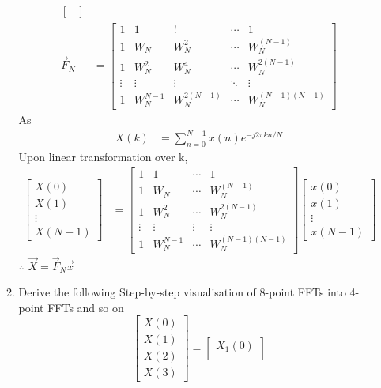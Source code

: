 \documentclass[journal,12pt,twocolumn]{IEEEtran}
\renewcommand\thesection{\arabic{section}}
\begin{document}
\begin{enumerate}[label=\thesection.\arabic*]
\begin{enumerate}[label=\arabic*.,ref=\thesection.\theenumi]
\begin{align}
\begin{bmatrix}
       \end{bmatrix}\\
       \vec{F}_N &=\begin{bmatrix}
         1&1&!&\cdots&1\\1&W_N&W^2_N&\cdots&W_N^{(N-1)}\\1&W_N^2&W_N^4&\cdots&W^{2(N-1)}_N\\\vdots&\vdots&\vdots&\ddots&\vdots\\1&W_N^{N-1}&W_N^{2(N-1)}&\cdots&W_N^{(N-1)(N-1)}
       \end{bmatrix}
     \end{align}
     As \begin{align} 
       X(k)&=\sum_{n=0}^{N-1} x(n) e^{-j 2 \pi k n /N}
     \end{align}
     Upon linear transformation over k,
     \begin{align}
       \begin{bmatrix}
         X(0)\\X(1)\\ \vdots\\ X(N-1)
       \end{bmatrix}
       &=\begin{bmatrix}
         1&1&\cdots&1\\1&W_N&\cdots&W_N^{(N-1)}\\1&W_N^2&\cdots&W^{2(N-1)}_N\\\vdots&\vdots&\vdots&\vdots\\1&W_N^{N-1}&\cdots&W_N^{(N-1)(N-1)}
       \end{bmatrix}\begin{bmatrix}
         x(0)\\x(1)\\\vdots\\ x(N-1)
       \end{bmatrix}
     \end{align}
   $\therefore$ $\vec{X} = \vec{F}_N \vec{x}$
     \item Derive the following Step-by-step visualisation  of
     8-point FFTs into 4-point FFTs and so on
     \begin{equation}
       \begin{bmatrix}
         X(0) \\ 
         X(1) \\ 
         X(2) \\ 
         X(3)
       \end{bmatrix}
       =
       \begin{bmatrix}
         X_{1}(0) \\ 

\end{bmatrix}
\end{equation}
\end{enumerate}
\end{enumerate}
\end{document}
